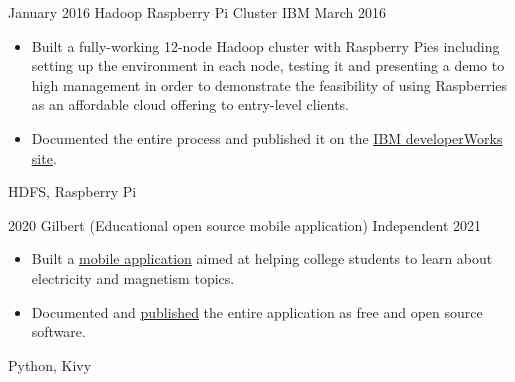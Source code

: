 \begin{projects}
    \emptySeparator

    \project
        {January 2016}
        {Hadoop Raspberry Pi Cluster}
        {IBM}
        {March 2016}
        {
            \begin{itemize}
                \item Built a fully-working 12-node Hadoop cluster with 
                    Raspberry Pies including setting up the environment in each 
                    node, testing it and presenting a demo to high management 
                    in order to demonstrate the feasibility of using 
                    Raspberries as an affordable cloud offering to entry-level 
                    clients.
                \item Documented the entire process and published it on the 
                    \href{https://developer.ibm.com/recipes/tutorials/building-a-hadoop-cluster-with-raspberry-pi/}
                    {\underline{IBM developerWorks site}}.
            \end{itemize}
        }
        {
            HDFS,
            Raspberry Pi
        }

    \emptySeparator

    \project
        {2020}
        {Gilbert (Educational open source mobile application)}
        {Independent}
        {2021}
        {
            \begin{itemize}
                \item Built a \href{https://github.com/alanverdugo/gilbert/}{\underline{mobile application}}
                    aimed at helping college students to learn about electricity
                    and magnetism topics.
                \item Documented and
                    \href{https://play.google.com/store/apps/details?id=net.kippel.gilbert/}
                    {\underline{published}} the entire application as free and open
                    source software.
            \end{itemize}
        }
        {
            Python,
            Kivy
        }



\end{projects}
